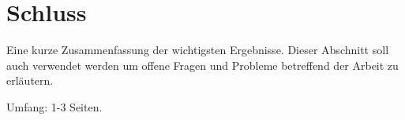 \chapter{Schluss}
\label{cha:Schluss}

Eine kurze Zusammenfassung der wichtigsten Ergebnisse.
Dieser Abschnitt soll auch verwendet werden um offene Fragen und Probleme betreffend der Arbeit zu erl\"autern.

Umfang: 1-3 Seiten.
